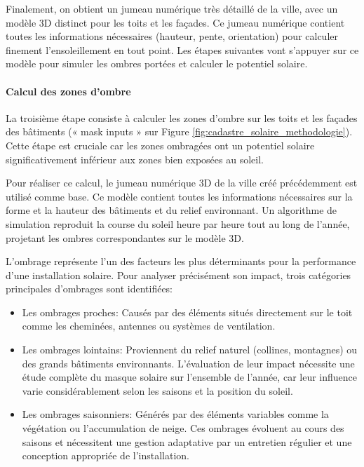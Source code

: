 \par{Finalement, on obtient un jumeau numérique très détaillé de la ville, avec un modèle 3D distinct pour les toits et les façades. Ce jumeau numérique contient toutes les informations nécessaires (hauteur, pente, orientation) pour calculer finement l'ensoleillement en tout point. Les étapes suivantes vont s'appuyer sur ce modèle pour simuler les ombres portées et calculer le potentiel solaire.}

\paragraph{Calcul des zones d'ombre}
\par{La troisième étape consiste à calculer les zones d'ombre sur les toits et les façades des bâtiments (« mask inputs » sur Figure \ref{fig:cadastre_solaire_methodologie}). Cette étape est cruciale car les zones ombragées ont un potentiel solaire significativement inférieur aux zones bien exposées au soleil.}
\par{Pour réaliser ce calcul, le jumeau numérique 3D de la ville créé précédemment est utilisé comme base. Ce modèle contient toutes les informations nécessaires sur la forme et la hauteur des bâtiments et du relief environnant. Un algorithme de simulation reproduit la course du soleil heure par heure tout au long de l'année, projetant les ombres correspondantes sur le modèle 3D.}
\par{L'ombrage représente l'un des facteurs les plus déterminants pour la performance d'une installation solaire. Pour analyser précisément son impact, trois catégories principales d'ombrages sont identifiées:}
\begin{itemize}
    \item Les ombrages proches: Causés par des éléments situés directement sur le toit comme les cheminées, antennes ou systèmes de ventilation.
    \item Les ombrages lointains: Proviennent du relief naturel (collines, montagnes) ou des grands bâtiments environnants. L'évaluation de leur impact nécessite une étude complète du masque solaire sur l'ensemble de l'année, car leur influence varie considérablement selon les saisons et la position du soleil.
    \item Les ombrages saisonniers: Générés par des éléments variables comme la végétation ou l'accumulation de neige. Ces ombrages évoluent au cours des saisons et nécessitent une gestion adaptative par un entretien régulier et une conception appropriée de l'installation.
\end{itemize}
